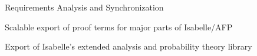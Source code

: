 \begin{workpackage}[id=libraries,type=RTD,
  short={Large libraries},%
  title={Large libraries},
  lead=Tum,
  StrRM=18,
  ChaRM=12,
  TumRM=27]
\begin{tasklist}
\end{tasklist}

\begin{wpdelivs}
  \begin{wpdeliv}[due=3,id=requirements,dissem=PU,nature=DEM,lead=Inr]
      {Requirements Analysis and Synchronization}
\end{wpdeliv}
  \begin{wpdeliv}[due=36,id=requirements,dissem=PU,nature=DEM,lead=Tum]
      {Scalable export of proof terms for major parts of Isabelle/AFP}
  \end{wpdeliv}
  \begin{wpdeliv}[due=36,id=requirements,dissem=PU,nature=DEM,lead=Tum]
      {Export of Isabelle's extended analysis and probability theory library}
  \end{wpdeliv}
\end{wpdelivs}
\end{workpackage}

